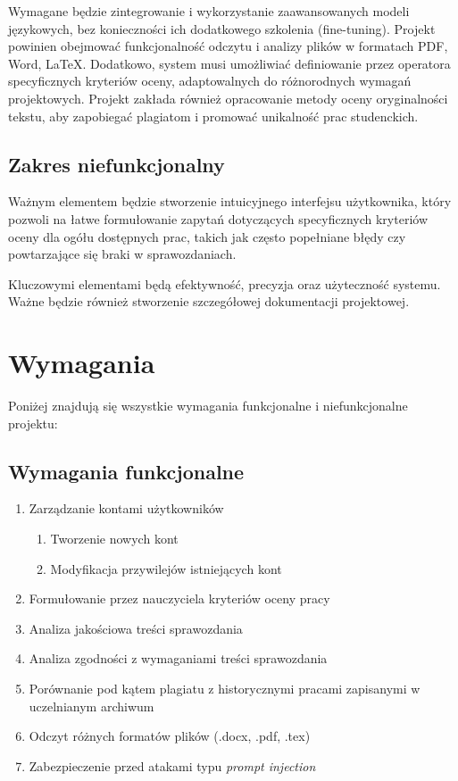 \documentclass[a4paper, 12pt]{article}
\begin{document}
Wymagane będzie zintegrowanie i wykorzystanie zaawansowanych modeli językowych, bez konieczności ich dodatkowego
szkolenia (fine-tuning).
Projekt powinien obejmować funkcjonalność odczytu i analizy plików w formatach PDF, Word, LaTeX. Dodatkowo, system musi
umożliwiać definiowanie przez operatora specyficznych kryteriów oceny, adaptowalnych do różnorodnych wymagań
projektowych.
Projekt zakłada również opracowanie metody oceny oryginalności tekstu, aby zapobiegać plagiatom i promować unikalność
prac studenckich.

\subsection{Zakres niefunkcjonalny}
Ważnym elementem będzie stworzenie intuicyjnego interfejsu użytkownika, który pozwoli na łatwe formułowanie zapytań
dotyczących specyficznych kryteriów oceny dla ogółu dostępnych prac, takich jak często popełniane błędy czy powtarzające
się braki w sprawozdaniach.

Kluczowymi elementami będą efektywność, precyzja oraz użyteczność systemu.
Ważne będzie również stworzenie szczegółowej dokumentacji projektowej.

\section{Wymagania}
Poniżej znajdują się wszystkie wymagania funkcjonalne i niefunkcjonalne projektu:

\subsection{Wymagania funkcjonalne}

\begin{enumerate}
    \item Zarządzanie kontami użytkowników
    \begin{enumerate}
        \item Tworzenie nowych kont
        \item Modyfikacja przywilejów istniejących kont
    \end{enumerate}
    \item Formułowanie przez nauczyciela kryteriów oceny pracy
    \item Analiza jakościowa treści sprawozdania
    \item Analiza zgodności z wymaganiami treści sprawozdania
    \item Porównanie pod kątem plagiatu z historycznymi pracami zapisanymi w uczelnianym archiwum
    \item Odczyt różnych formatów plików (.docx, .pdf, .tex)
    \item Zabezpieczenie przed atakami typu \textit{prompt injection}
\end{enumerate}
\end{document}
